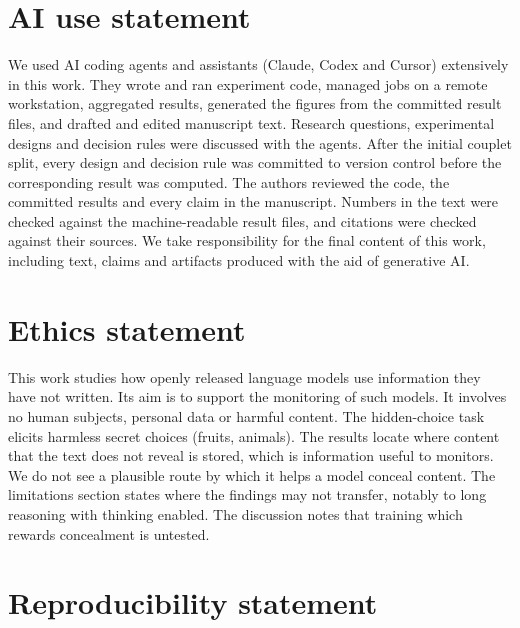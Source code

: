 \documentclass[
]{article}
\begin{document}
\section*{AI use statement}\label{ai-use-statement}

We used AI coding agents and assistants (Claude, Codex and Cursor)
extensively in this work. They wrote and ran experiment code, managed
jobs on a remote workstation, aggregated results, generated the figures
from the committed result files, and drafted and edited manuscript text.
Research questions, experimental designs and decision rules were
discussed with the agents. After the initial couplet split, every design
and decision rule was committed to version control before the
corresponding result was computed. The authors reviewed the code, the
committed results and every claim in the manuscript. Numbers in the text
were checked against the machine-readable result files, and citations
were checked against their sources. We take responsibility for the final
content of this work, including text, claims and artifacts produced with
the aid of generative AI.

\section*{Ethics statement}\label{ethics-statement}

This work studies how openly released language models use information
they have not written. Its aim is to support the monitoring of such
models. It involves no human subjects, personal data or harmful content.
The hidden-choice task elicits harmless secret choices (fruits,
animals). The results locate where content that the text does not reveal
is stored, which is information useful to monitors. We do not see a
plausible route by which it helps a model conceal content. The
limitations section states where the findings may not transfer, notably
to long reasoning with thinking enabled. The discussion notes that
training which rewards concealment is untested.

\section*{Reproducibility statement}\label{reproducibility-statement}
\end{document}
